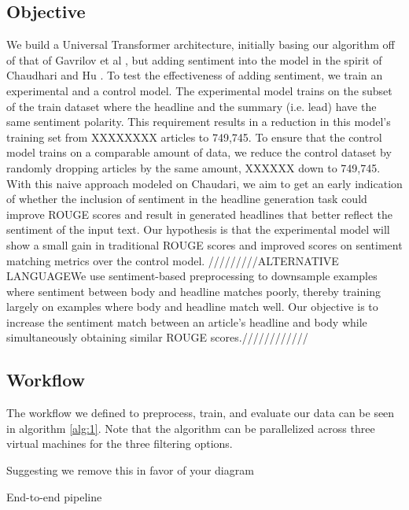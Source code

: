 \documentclass[11pt]{article}
\begin{document}
\subsection{Objective}
We build a Universal Transformer architecture, initially basing our algorithm off of that of Gavrilov et al \cite{DBLP:journals/corr/abs-1901-07786}, but adding sentiment into the model in the spirit of Chaudhari   \cite{DBLP:journals/corr/abs-1802-09426} and Hu \cite{DBLP:journals/corr/HuYLSX17}. To test the effectiveness of adding sentiment, we train an experimental and a control model.
The experimental model trains on the subset of the train dataset where the headline and the summary (i.e. lead) have the same sentiment polarity. This requirement results in a reduction in this model's training set from XXXXXXXX articles to 749,745. To ensure that the control model trains on a comparable amount of data, we reduce the control dataset by randomly dropping articles by the same amount, XXXXXX down to 749,745. 
With this naive approach modeled on Chaudari\cite{DBLP:journals/corr/abs-1802-09426}, we aim to get an early indication of whether the inclusion of sentiment in the headline generation task could improve ROUGE scores and result in generated headlines that better reflect the sentiment of the input text. Our hypothesis is that the experimental model will show a small gain in traditional ROUGE scores and improved scores on sentiment matching metrics over the control model. 
/////////ALTERNATIVE LANGUAGEWe use sentiment-based preprocessing to downsample examples where sentiment between body and headline matches poorly, thereby training largely on examples where body and headline match well. Our objective is to increase the sentiment match between an article's headline and body while simultaneously obtaining similar ROUGE scores.////////////

\subsection{Workflow}

The workflow we defined to preprocess, train, and evaluate our data can be seen in algorithm \ref{alg:1}. Note that the algorithm can be parallelized across three virtual machines for the three filtering options.

Suggesting we remove this in favor of your diagram

\begin{algorithm}[H]
\SetAlgoLined
 \caption{End-to-end pipeline}
\label{alg:1}
\end{algorithm}
\end{document}
